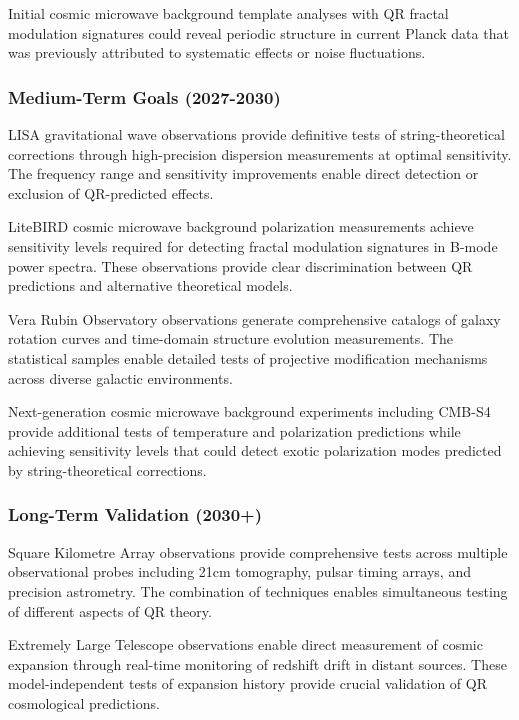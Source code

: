 Initial cosmic microwave background template analyses with QR fractal modulation signatures could reveal periodic structure in current Planck data that was previously attributed to systematic effects or noise fluctuations.

\subsubsection{Medium-Term Goals (2027-2030)}
\label{subsubsec:medium-term-goals}

LISA gravitational wave observations provide definitive tests of string-theoretical corrections through high-precision dispersion measurements at optimal sensitivity. The frequency range and sensitivity improvements enable direct detection or exclusion of QR-predicted effects.

LiteBIRD cosmic microwave background polarization measurements achieve sensitivity levels required for detecting fractal modulation signatures in B-mode power spectra. These observations provide clear discrimination between QR predictions and alternative theoretical models.

Vera Rubin Observatory observations generate comprehensive catalogs of galaxy rotation curves and time-domain structure evolution measurements. The statistical samples enable detailed tests of projective modification mechanisms across diverse galactic environments.

Next-generation cosmic microwave background experiments including CMB-S4 provide additional tests of temperature and polarization predictions while achieving sensitivity levels that could detect exotic polarization modes predicted by string-theoretical corrections.

\subsubsection{Long-Term Validation (2030+)}
\label{subsubsec:long-term-validation}

Square Kilometre Array observations provide comprehensive tests across multiple observational probes including 21cm tomography, pulsar timing arrays, and precision astrometry. The combination of techniques enables simultaneous testing of different aspects of QR theory.

Extremely Large Telescope observations enable direct measurement of cosmic expansion through real-time monitoring of redshift drift in distant sources. These model-independent tests of expansion history provide crucial validation of QR cosmological predictions.

